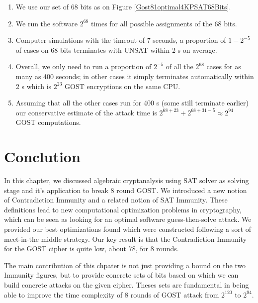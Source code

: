 \begin{enumerate}
	\item
	We use our set of 68 bits as
	on Figure \ref{Gost81optimal4KPSAT68Bits}. %
	\item
	We run the software $2^{68}$ times for all possible assignments of the 68 bits.
	\item
	Computer simulations
	with the timeout of 7 seconds,
	a proportion of $1-2^{-5}$ of cases on 68 bits terminates with UNSAT
	within 2 s on average.
	\item
	Overall, we only need to run a proportion of $2^{-5}$ of all the $2^{68}$ cases
	for as many as 400 seconds;
	in other cases it simply terminates automatically within 2 s
	which is $2^{23}$ GOST encryptions on the same CPU.
	\item
	Assuming that all the other cases run for 400 s (some still terminate earlier)
	our conservative estimate of the attack time is
	$2^{68+23}+2^{68+31-5}\approx 2^{94}$ GOST computations.
\end{enumerate}

\section{Conclution}
In this chapter, we discussed algebraic cryptanalysis using SAT solver as solving stage and it's application to break 8 round GOST. We introduced a new notion of Contradiction Immunity and a related notion of SAT Immunity. These definitions lead to new computational optimization problems in cryptography, which can be seen as looking for an optimal software guess-then-solve attack. We provided our best optimizations found which were constructed following a sort of meet-in-the middle strategy. Our key result is that the Contradiction Immunity for the GOST cipher is quite low, about 78, for 8 rounds. 

The main contribution of this chpater is not just providing a bound on the two Immunity figures, but to provide concrete sets of bits based on which we can build concrete attacks on the given cipher. Theses sets are fundamental in being able to improve the time complexity of 8 rounds of GOST attack from $2^{120}$ to $2^{94}$. 

